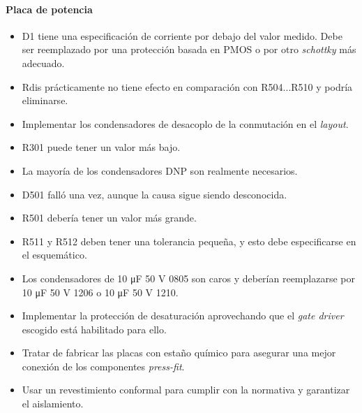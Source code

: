 \paragraph*{Placa de potencia}
\begin{itemize}
	\item D1 tiene una especificación de corriente por debajo del valor medido. Debe ser reemplazado por una protección basada en PMOS o por otro \textit{schottky} más adecuado.
	\item Rdis prácticamente no tiene efecto en comparación con R504...R510 y podría eliminarse.
	\item Implementar los condensadores de desacoplo de la conmutación en el \textit{layout}.
	\item R301 puede tener un valor más bajo.
	\item La mayoría de los condensadores DNP son realmente necesarios.
	\item D501 falló una vez, aunque la causa sigue siendo desconocida.
	\item R501 debería tener un valor más grande.
	\item R511 y R512 deben tener una tolerancia pequeña, y esto debe especificarse en el esquemático.
	\item Los condensadores de 10 \unit{\micro\farad} 50 V 0805 son caros y deberían reemplazarse por 10 \unit{\micro\farad} 50 V 1206 o 10 \unit{\micro\farad} 50 V 1210.
	\item Implementar la protección de desaturación aprovechando que el \textit{gate driver} escogido está habilitado para ello.
	\item Tratar de fabricar las placas con estaño químico para asegurar una mejor conexión de los componentes \textit{press-fit}.	
	\item Usar un revestimiento conformal para cumplir con la normativa y garantizar el aislamiento.
\end{itemize}

